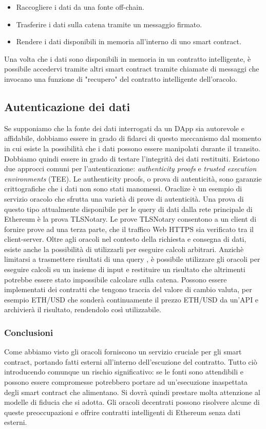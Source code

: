 \begin{itemize}
	\item Raccogliere i dati da una fonte off-chain.
	\item Trasferire i dati sulla catena tramite un messaggio firmato.
	\item Rendere i dati disponibili in memoria all'interno di uno smart contract.
\end{itemize}
Una volta che i dati sono disponibili in memoria in un contratto intelligente, è possibile accedervi tramite altri smart contract tramite chiamate di messaggi che invocano una funzione di "recupero" del contratto intelligente dell'oracolo.

\subsection*{Autenticazione dei dati}
Se supponiamo che la fonte dei dati interrogati da un DApp sia autorevole e affidabile, dobbiamo essere in grado di fidarci di questo meccanismo dal momento in cui esiste la possibilità che i dati possono essere manipolati durante il transito. Dobbiamo quindi essere in grado di testare l'integrità dei dati restituiti. Esistono due approcci comuni per l'autenticazione: \textit{authenticity proofs} e \textit{trusted execution environments} (TEE). Le authenticity proofs, o prova di autenticità, sono garanzie crittografiche che i dati non sono stati manomessi.  Oraclize è un esempio di servizio oracolo che sfrutta una varietà di prove di autenticità. Una prova di questo tipo attualmente disponibile per le query di dati dalla rete principale di Ethereum è la prova TLSNotary. Le prove TLSNotary consentono a un client di fornire prove ad una terza parte, che il traffico Web HTTPS sia verificato tra il client-server.
Oltre agli oracoli nel contesto della richiesta e consegna di dati, esiste anche la possibilità di utilizzarli per eseguire calcoli arbitrari. Anzichè limitarsi a trasmettere risultati di una query , è possibile utilizzare gli oracoli per eseguire calcoli su un insieme di input e restituire un risultato che altrimenti potrebbe essere stato impossibile calcolare sulla catena.
Possono essere implementati dei contratti che tengono traccia del valore di cambio valuta, per esempio ETH/USD che sonderà continuamente il prezzo ETH/USD da un'API e archivierà il risultato, rendendolo così utilizzabile.

\subsubsection{Conclusioni}
Come abbiamo visto gli oracoli forniscono un servizio cruciale per gli smart contract, portando fatti esterni all'interno dell'escuzione del contratto. Tutto ciò introducendo comunque un rischio significativo: se le fonti sono attendibili e possono essere compromesse potrebbero portare ad un'esecuzione inaspettata degli smart contract che alimentano. Si dovrà quindi prestare molta attenzione al modelle di fiducia che si adotta. Gli oracoli decentrati possono risolvere alcune di queste preoccupazioni e offrire contratti intelligenti di Ethereum senza dati esterni. 

